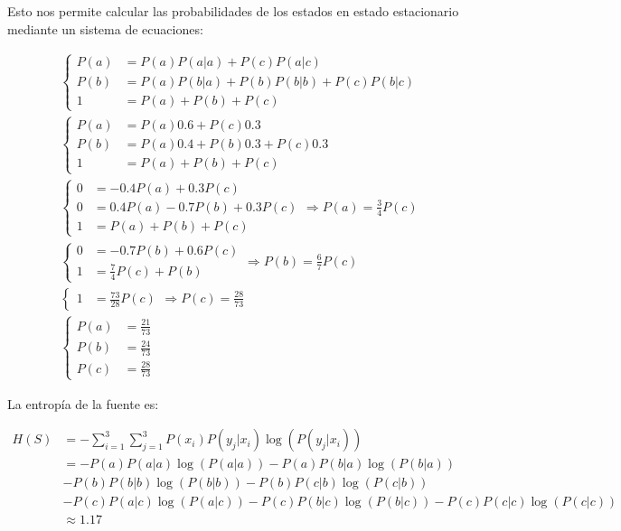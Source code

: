 \documentclass{article}
\begin{document}
Esto nos permite calcular las probabilidades de los estados en estado estacionario mediante un sistema de ecuaciones:

\begin{align}
    &\begin{cases}
    P(a) &= P(a)P(a|a) + P(c)P(a|c)\\
    P(b) &= P(a)P(b|a) + P(b)P(b|b) + P(c)P(b|c)\\
    1 &= P(a) + P(b) + P(c)
    \end{cases}\\
    &\begin{cases}
    P(a) &= P(a)0.6 + P(c)0.3\\
    P(b) &= P(a)0.4 + P(b)0.3 + P(c)0.3\\
    1 &= P(a) + P(b) + P(c)
    \end{cases}\\
    &\begin{cases}
    0 &= -0.4P(a) + 0.3P(c)\\
    0 &= 0.4P(a) - 0.7P(b) + 0.3P(c)\\
    1 &= P(a) + P(b) + P(c)
    \end{cases} \Rightarrow P(a) = \frac{3}{4}P(c)\\
    &\begin{cases}
    0 &= - 0.7P(b) + 0.6P(c)\\
    1 &= \frac{7}{4}P(c) + P(b)
    \end{cases} \Rightarrow P(b) = \frac{6}{7}P(c)\\
    &\begin{cases}
    1 &= \frac{73}{28}P(c) 
    \end{cases} \Rightarrow P(c) = \frac{28}{73}\\
    &\begin{cases}
    P(a) &= \frac{21}{73}\\
    P(b) &= \frac{24}{73}\\
    P(c) &= \frac{28}{73}
    \end{cases}
\end{align}

La entropía de la fuente es:

\begin{align*}
    H(S) &= -\sum_{i=1}^{3}\sum_{j=1}^{3}P(x_i)P(y_j|x_i)\log\left(P(y_j|x_i)\right)\\
    &= -P(a)P(a|a)\log\left(P(a|a)\right) - P(a)P(b|a)\log\left(P(b|a)\right)\\
    &- P(b)P(b|b)\log\left(P(b|b)\right) - P(b)P(c|b)\log\left(P(c|b)\right)\\
    &- P(c)P(a|c)\log\left(P(a|c)\right) - P(c)P(b|c)\log\left(P(b|c)\right) - P(c)P(c|c)\log\left(P(c|c)\right)\\
    &\approx 1.17
\end{align*}
\end{document}

